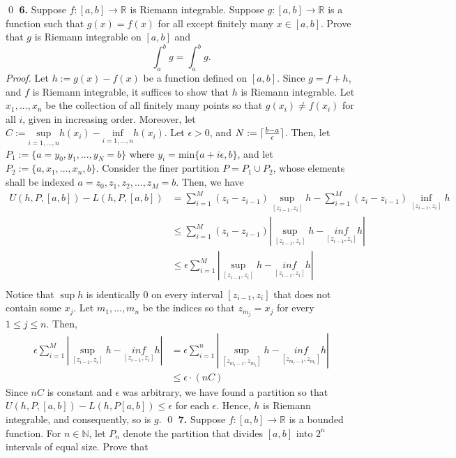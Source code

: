 \documentclass{article}
\DeclarePairedDelimiter\ceil{\lceil}{\rceil}
\begin{document}
\qed
\newpage \noindent
\textbf{6.} Suppose $f:[a,b]\rightarrow \mathbb{R}$ is Riemann integrable. Suppose $g:[a,b]\rightarrow \mathbb{R}$ is a function such that $g(x)=f(x)$ for all except finitely many $x\in[a,b]$. Prove that $g$ is Riemann integrable on $[a,b]$ and 
\begin{equation*}
    \int_{a}^{b}g=\int_{a}^{b}g.
\end{equation*}
\textit{Proof.} Let $h:=g(x)-f(x)$ be a function defined on $[a,b]$. Since $g=f+h$, and $f$ is Riemann integrable, it suffices to show that $h$ is Riemann integrable. Let $x_1,...,x_n$ be the collection of all finitely many points so that $g(x_i)\neq f(x_i)$ for all $i$, given in increasing order. Moreover, let $C:=\underset{i=1,...,n}{\text{sup}}h(x_i)-\underset{i=1,...,n}{\text{inf}}h(x_i)$.
\newline
\newline
Let $\epsilon>0$, and $N:=\ceil{\frac{b-a}\epsilon}$. Then, let $P_1:=\{a=y_0,y_1,...,y_N=b\}$ where $y_i=\text{min}\{a+i\epsilon,b\}$, and let $P_2:=\{a,x_1,...,x_n,b\}$. Consider the finer partition $P=P_1\cup P_2$, whose elements shall be indexed $a=z_0,z_1,z_2,...,z_M=b$. Then, we have
\begin{align*}
    U(h,P,[a,b])-L(h,P,[a,b])&= \sum_{i=1}^{M}(z_{i}-z_{i-1})\underset{[z_{i-1},z_i]}{\sup} h- \sum_{i=1}^{M}(z_{i}-z_{i-1})\underset{[z_{i-1},z_i]}{\inf} h\\
    &\leq \sum_{i=1}^{M}(z_{i}-z_{i-1})|\underset{[z_{i-1},z_i]}{\sup} h-\underset{[z_{i-1},z_i]}{inf} h|\\
    &\leq \epsilon\sum_{i=1}^{M}|\underset{[z_{i-1},z_i]}{\sup} h-\underset{[z_{i-1},z_i]}{inf} h|\\
\end{align*}
Notice that $\sup h$ is identically 0 on every interval $[z_{i-1},z_i]$ that does not contain some $x_j$. Let $m_1,...,m_n$ be the indices so that $z_{m_j}=x_j$ for every $1\leq j \leq n$. Then,
\begin{align*}
    \epsilon\sum_{i=1}^{M}|\underset{[z_{i-1},z_i]}{\sup} h-\underset{[z_{i-1},z_i]}{inf} h|&=\epsilon\sum_{i=1}^{n}|\underset{[z_{m_i-1},z_{m_i}]}{\sup} h-\underset{[z_{m_i-1},z_{m_i}]}{inf} h|\\
    &\leq \epsilon \cdot(nC)
\end{align*}
Since $nC$ is constant and $\epsilon$ was arbitrary, we have found a partition so that $U(h,P,[a,b])-L(h,P[a,b])\leq \epsilon$ for each $\epsilon$. Hence, $h$ is Riemann integrable, and consequently, so is $g$. \qed
\newpage
\textbf{7. }Suppose $f:[a,b]\rightarrow \mathbb{R}$ is a bounded function. For $n\in \mathbb{N}$, let $P_n$ denote the partition that divides $[a,b]$ into $2^n$ intervals of equal size. Prove that 
\end{document}

